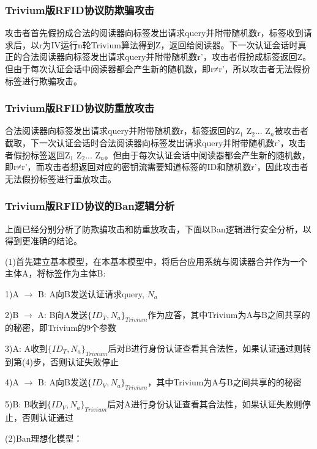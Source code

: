 \subsubsection{Trivium版RFID协议防欺骗攻击}

攻击者首先假扮成合法的阅读器向标签发出请求query并附带随机数r，标签收到请求后，以r为IV运行n轮Trivium算法得到Z，返回给阅读器。下一次认证会话时真正的合法阅读器向标签发出请求query并附带随机数r'，攻击者假扮成标签返回Z。但由于每次认证会话中阅读器都会产生新的随机数，即r≠r'，所以攻击者无法假扮标签进行欺骗攻击。

\subsubsection{Trivium版RFID协议防重放攻击}

合法阅读器向标签发出请求query并附带随机数r，标签返回的Z$_{1}$ Z$_{2}$... Z$_{n}$被攻击者截取，下一次认证会话时合法阅读器向标签发出请求query并附带随机数r'，攻击者假扮标签返回Z$_{1}$ Z$_{2}$... Z$_{n}$。但由于每次认证会话中阅读器都会产生新的随机数，即r≠r'，而攻击者想返回对应的密钥流需要知道标签的ID和随机数r'，因此攻击者无法假扮标签进行重放攻击。

\subsubsection{Trivium版RFID协议的Ban逻辑分析}

上面已经分别分析了防欺骗攻击和防重放攻击，下面以Ban逻辑进行安全分析，以得到更准确的结论。\vspace{3ex}

(1)首先建立基本模型，在本基本模型中，将后台应用系统与阅读器合并作为一个主体A，将标签作为主体B:

1)A $\rightarrow$ B: A向B发送认证请求{query, $N_{a}$}

2)B $\rightarrow$ A: B向A发送$\{ID_{T}, N_{a}\}_{Trivium}$作为应答，其中Trivium为A与B之间共享的的秘密，即Trivium的9个参数

3)A: A收到$\{ID_{T}, N_{a}\}_{Trivium}$后对B进行身份认证查看其合法性，如果认证通过则转到第(4)步，否则认证失败停止

4)A $\rightarrow$ B: A向B发送$\{ID_{V}, N_{a}\}_{Trivium}$，其中Trivium为A与B之间共享的的秘密

5)B: B收到$\{ID_{V}, N_{a}\}_{Trivium}$后对A进行身份认证查看其合法性，如果认证失败则停止，否则认证通过

\vspace{3ex}

(2)Ban理想化模型：

